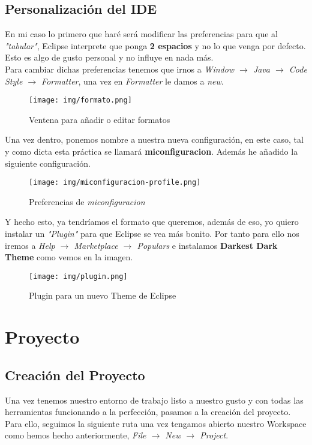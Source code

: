\documentclass{article}
\begin{document}
    \subsection{Personalización del IDE}
      En mi caso lo primero que haré será modificar las preferencias para que al \textit{"tabular"}, Eclipse interprete que ponga \textbf{2 espacios} y no lo que venga 
      por defecto. Esto es algo de gusto personal y no influye en nada más.\\
      Para cambiar dichas preferencias tenemos que irnos a \textit{Window $\rightarrow$ Java $\rightarrow$ Code Style $\rightarrow$ Formatter}, una vez en \textit{Formatter} le damos a \textit{new}.
      \begin{figure}[h]
        \centering
        \texttt{[image: img/formato.png]}
        \caption{Ventena para añadir o editar formatos}
      \end{figure}
  
  \newpage
      Una vez dentro, ponemos nombre a nuestra nueva configuración, en este caso, tal y como dicta esta práctica se llamará \textbf{miconfiguracion}. Además he añadido la siguiente 
      configuración.
      \begin{figure}[h]
        \centering
        \texttt{[image: img/miconfiguracion-profile.png]}
        \caption{Preferencias de \textit{miconfiguracion}}
      \end{figure}

      Y hecho esto, ya tendríamos el formato que queremos, además de eso, yo quiero instalar un \textit{"Plugin"} para que Eclipse se vea más bonito.
      Por tanto para ello nos iremos a \textit{Help $\rightarrow$ Marketplace $\rightarrow$ Populars} e instalamos \textbf{Darkest Dark Theme} como vemos en la imagen.
      \begin{figure}[h]
        \centering
        \texttt{[image: img/plugin.png]}
        \caption{Plugin para un nuevo Theme de Eclipse}
      \end{figure}

  \newpage
    \section{Proyecto}
      \subsection{Creación del Proyecto}
        Una vez tenemos nuestro entorno de trabajo listo a nuestro gusto y con todas las herramientas funcionando a la perfección, pasamos a la creación del proyecto.
        Para ello, seguimos la siguiente ruta una vez tengamos abierto nuestro Workspace como hemos hecho anteriormente, 
        \textit{File $\rightarrow$ New $\rightarrow$ Project}.
\end{document}
